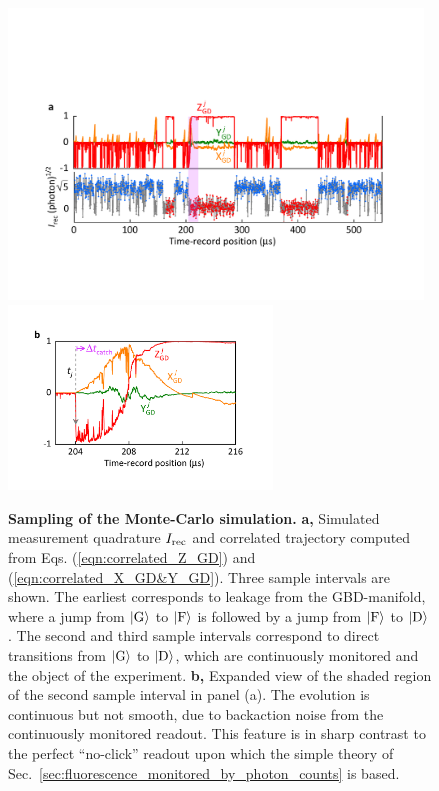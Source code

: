 \documentclass[
						superscriptaddress, 																 amsmath, amssymb,
		 aps,  prb,  
										floatfix,
		linenumbers,
			]{revtex4-1}
\begin{document}
\begin{figure}[t]
\begin{centering}
\vskip0.5cm
\includegraphics[width=11cm]{figure3.pdf}\hbox{\includegraphics[width=7cm]{figure4.pdf}}
\caption{\label{fig:monte-carlo}
\textbf{Sampling of the Monte-Carlo simulation.} \textbf{a,} Simulated measurement quadrature $I_{\rm rec}$ and correlated trajectory computed from Eqs. (\ref{eqn:correlated_Z_GD}) and (\ref{eqn:correlated_X_GD&Y_GD}). Three sample intervals are shown. The earliest corresponds to leakage from the GBD-manifold, where a jump from $|{\rm G}\rangle$ to $|{\rm F}\rangle$ is followed by a jump from $|{\rm F}\rangle$ to $|{\rm D}\rangle$. The second and third sample intervals correspond to direct transitions from $|{\rm G}\rangle$ to $|{\rm D}\rangle$, which are continuously monitored and the object of the experiment. \textbf{b,} Expanded view of the shaded region of the second sample interval in panel (a). The evolution is continuous but not smooth, due to backaction noise from the continuously monitored readout. This feature is in sharp contrast to the perfect ``no-click'' readout upon which the simple theory of Sec.~\ref{sec:fluorescence_monitored_by_photon_counts} is based.
}
\vskip2.0cm


\end{centering}
\end{figure}
\end{document}
